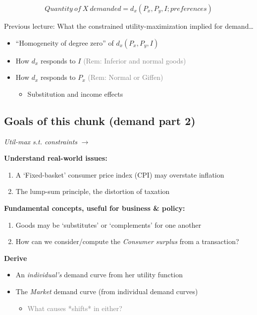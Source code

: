 \documentclass[]{article}
\providecommand{\tightlist}{%
  \setlength{\itemsep}{0pt}\setlength{\parskip}{0pt}}
\begin{document}
\[Quantity \: of \: X \: demanded = d_x(P_x, P_y, I; preferences)\]

\bigskip

Previous lecture: What the constrained utility-maximization implied for
demand\ldots{}

\begin{itemize}
\item
  ``Homogeneity of degree zero'' of \(d_x(P_x, P_y, I)\)
\item
  How \(d_x\) responds to \(I\)
  \textcolor{gray}{(Rem: Inferior and normal goods)}
\item
  How \(d_x\) responds to \(P_x\)
  \textcolor{gray}{(Rem: Normal or Giffen)}

  \begin{itemize}
  \tightlist
  \item
    Substitution and income effects
  \end{itemize}
\end{itemize}

\hypertarget{goals-of-this-chunk-demand-part-2}{%
\subsection{Goals of this chunk (demand part
2)}\label{goals-of-this-chunk-demand-part-2}}

\emph{Util-max s.t. constraints} \(\rightarrow\)

\textbf{Understand real-world issues:}

\begin{enumerate}
\def\labelenumi{\arabic{enumi}.}
\item
  A `Fixed-basket' consumer price index (CPI) may overstate inflation
\item
  The lump-sum principle, the distortion of taxation
\end{enumerate}

\textbf{Fundamental concepts, useful for business \& policy:}

\begin{enumerate}
\def\labelenumi{\arabic{enumi}.}
\item
  Goods may be `substitutes' or `complements' for one another
\item
  How can we consider/compute the \emph{Consumer surplus} from a
  transaction?
\end{enumerate}

\textbf{Derive}

\begin{itemize}
\item
  An \emph{individual's} demand curve from her utility function
\item
  The \emph{Market} demand curve (from individual demand curves)

  \begin{itemize}
  \tightlist
  \item
    \textcolor{gray}{What causes *shifts* in either?}
  \end{itemize}
\end{itemize}
\end{document}
